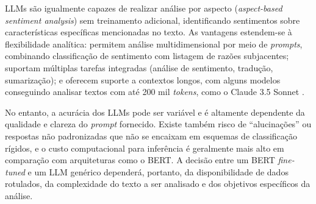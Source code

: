 LLMs são igualmente capazes de realizar análise por aspecto (\textit{aspect-based sentiment
analysis}) sem treinamento adicional, identificando sentimentos sobre características específicas
mencionadas no texto. As vantagens estendem-se à flexibilidade analítica: permitem análise
multidimensional por meio de \textit{prompts}, combinando classificação de sentimento com listagem de
razões subjacentes; suportam múltiplas tarefas integradas (análise de sentimento, tradução,
sumarização); e oferecem suporte a contextos longos, com alguns modelos conseguindo analisar
textos com até 200 mil \textit{tokens}, como o Claude 3.5 Sonnet \cite{anthropic2024}.

No entanto, a acurácia dos LLMs pode ser variável e é altamente dependente da qualidade e
clareza do \textit{prompt} fornecido. Existe também risco de ``alucinações'' ou respostas não
padronizadas que não se encaixam em esquemas de classificação rígidos, e o custo computacional
para inferência é geralmente mais alto em comparação com arquiteturas como o BERT. A decisão
entre um BERT \textit{fine-tuned} e um LLM genérico dependerá, portanto, da disponibilidade de dados
rotulados, da complexidade do texto a ser analisado e dos objetivos específicos da análise.
